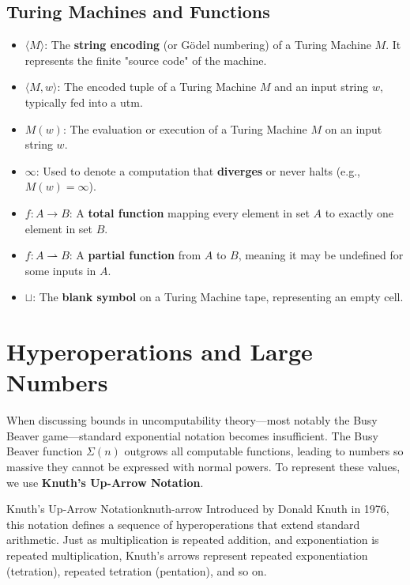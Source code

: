\subsection*{Turing Machines and Functions}
\begin{itemize}
    \item \(\langle M \rangle\): The \textbf{string encoding} (or G\"odel numbering) of a Turing Machine \(M\). It represents the finite "source code" of the machine.
    \item \(\langle M, w \rangle\): The encoded tuple of a Turing Machine \(M\) and an input string \(w\), typically fed into a \gls{utm}.
    \item \(M(w)\): The evaluation or execution of a Turing Machine \(M\) on an input string \(w\). 
    \item \(\infty\): Used to denote a computation that \textbf{diverges} or never halts (e.g., \(M(w) = \infty\)).
    \item \(f: A \rightarrow B\): A \textbf{total function} mapping every element in set \(A\) to exactly one element in set \(B\).
    \item \(f: A \rightharpoonup B\): A \textbf{partial function} from \(A\) to \(B\), meaning it may be undefined for some inputs in \(A\).
    \item \(\sqcup\): The \textbf{blank symbol} on a Turing Machine tape, representing an empty cell.
\end{itemize}

\section{Hyperoperations and Large Numbers}

When discussing bounds in uncomputability theory—most notably the Busy Beaver game—standard exponential notation becomes insufficient. The Busy Beaver function \(\Sigma(n)\) outgrows all computable functions, leading to numbers so massive they cannot be expressed with normal powers. To represent these values, we use \textbf{Knuth's Up-Arrow Notation}.

\begin{concept}{Knuth's Up-Arrow Notation}{knuth-arrow}
    Introduced by Donald Knuth in 1976, this notation defines a sequence of hyperoperations that extend standard arithmetic. Just as multiplication is repeated addition, and exponentiation is repeated multiplication, Knuth's arrows represent repeated exponentiation (tetration), repeated tetration (pentation), and so on.
\end{concept}

